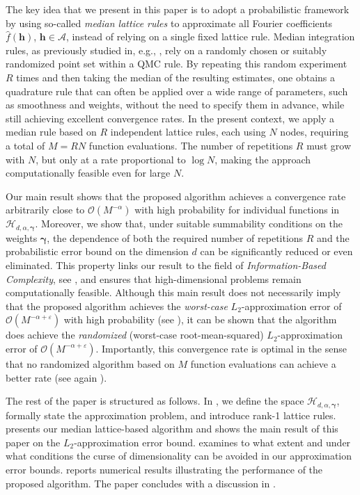 \documentclass[pdflatex,sn-basic,Numbered]{sn-jnl}%
\newcommand{\bsh}{\boldsymbol{h}}
\newcommand{\bsgamma}{\boldsymbol{\gamma}}
\newcommand{\Acal}{\mathcal{A}}
\newcommand{\Hcal}{\mathcal{H}}
\theoremstyle{thmstyleone}%
\theoremstyle{thmstyletwo}%
\begin{document}
The key idea that we present in this paper is to adopt a probabilistic framework by using so-called \textit{median lattice rules} to approximate all Fourier coefficients $\widehat{f}(\bsh)$, $\bsh\in \Acal$, instead of relying on a single fixed lattice rule. Median integration rules, as previously studied in, e.g., \cite{goda2022free, goda2024universal, pan2023super-pol, pan2024super-pol}, rely on a randomly chosen or suitably randomized point set within a QMC rule. By repeating this random experiment $R$ times and then taking the median of the resulting estimates, one obtains a quadrature rule that can often be applied over a wide range of parameters, such as smoothness and weights, without the need to specify them in advance, while still achieving excellent convergence rates.
In the present context, we apply a median rule based on $R$ independent lattice rules, each using $N$ nodes, requiring a total of $M=RN$ function evaluations.
The number of repetitions $R$ must grow with $N$, but only at a rate proportional to $\log N$, making the approach computationally feasible even for large $N$.

Our main result shows that the proposed algorithm achieves a convergence rate arbitrarily close to $\mathcal{O}(M^{-\alpha})$ with high probability for individual functions in $\Hcal_{d,\alpha,\bsgamma}$.
Moreover, we show that, under suitable summability conditions on the weights $\bsgamma$, the dependence of both the required number of repetitions $R$ and the probabilistic error bound on the dimension $d$ can be significantly reduced or even eliminated. This property links our result to the field of \emph{Information-Based Complexity}, see \cite{novak2008tractability}, and ensures that high-dimensional problems remain computationally feasible.
Although this main result does not necessarily imply that the proposed algorithm achieves the \emph{worst-case} $L_2$-approximation error of $\mathcal{O}(M^{-\alpha+\varepsilon})$ with high probability (see ), it can be shown that the algorithm does achieve the \emph{randomized} (worst-case root-mean-squared) $L_2$-approximation error of $\mathcal{O}(M^{-\alpha+\varepsilon})$.
Importantly, this convergence rate is optimal in the sense that no randomized algorithm based on $M$ function evaluations can achieve a better rate (see again ).

The rest of the paper is structured as follows. 
In , we define the space $\Hcal_{d,\alpha,\bsgamma}$, formally state the approximation problem, and introduce rank-1 lattice rules. 
 presents our median lattice-based algorithm and shows the main result of this paper on the $L_2$-approximation error bound. 
 examines to what extent and under what conditions the curse of dimensionality can be avoided in our approximation error bounds.
 reports numerical results illustrating the performance of the proposed algorithm.
The paper concludes with a discussion in .
\end{document}
